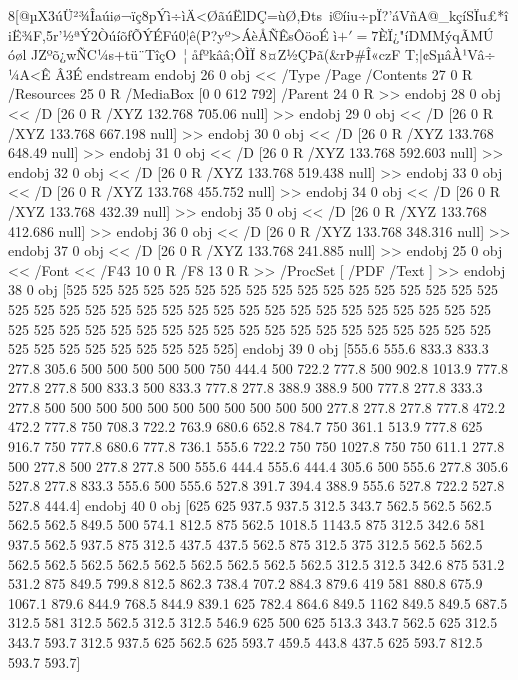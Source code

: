 {{{{8[@µX3úÜ²¾Îaúiø¬ïç8pÝì÷ìÄ<ØãúËlDÇ=ùØ,Ðts i©íiu÷pÏ?'áVñA@_kçíSÏu£*îiË¾F,5r'½ªÝ2ÒúíõfÕÝÉFú0¦ê(P?y­º>ÁèÅÑÊsÔöoÉ
ì$+'=7$ÈÏ¿"íDMMýqÃMÚ
óøl JZºõ¿wÑC¼s+tü¨TîçO~¦
åfºkââ;ÔÌÏ
8¤Z½ÇÞã({&rÞ#Î«czF
T;|¢SµâÀ¹Vâ÷
¼A<Ê%
Â3É
endstream
endobj
26 0 obj <<
/Type /Page
/Contents 27 0 R
/Resources 25 0 R
/MediaBox [0 0 612 792]
/Parent 24 0 R
>> endobj
28 0 obj <<
/D [26 0 R /XYZ 132.768 705.06 null]
>> endobj
29 0 obj <<
/D [26 0 R /XYZ 133.768 667.198 null]
>> endobj
30 0 obj <<
/D [26 0 R /XYZ 133.768 648.49 null]
>> endobj
31 0 obj <<
/D [26 0 R /XYZ 133.768 592.603 null]
>> endobj
32 0 obj <<
/D [26 0 R /XYZ 133.768 519.438 null]
>> endobj
33 0 obj <<
/D [26 0 R /XYZ 133.768 455.752 null]
>> endobj
34 0 obj <<
/D [26 0 R /XYZ 133.768 432.39 null]
>> endobj
35 0 obj <<
/D [26 0 R /XYZ 133.768 412.686 null]
>> endobj
36 0 obj <<
/D [26 0 R /XYZ 133.768 348.316 null]
>> endobj
37 0 obj <<
/D [26 0 R /XYZ 133.768 241.885 null]
>> endobj
25 0 obj <<
/Font << /F43 10 0 R /F8 13 0 R >>
/ProcSet [ /PDF /Text ]
>> endobj
38 0 obj
[525 525 525 525 525 525 525 525 525 525 525 525 525 525 525 525 525 525 525 525 525 525 525 525 525 525 525 525 525 525 525 525 525 525 525 525 525 525 525 525 525 525 525 525 525 525 525 525 525 525 525 525 525 525 525 525 525 525 525 525 525 525 525 525]
endobj
39 0 obj
[555.6 555.6 833.3 833.3 277.8 305.6 500 500 500 500 500 750 444.4 500 722.2 777.8 500 902.8 1013.9 777.8 277.8 277.8 500 833.3 500 833.3 777.8 277.8 388.9 388.9 500 777.8 277.8 333.3 277.8 500 500 500 500 500 500 500 500 500 500 500 277.8 277.8 277.8 777.8 472.2 472.2 777.8 750 708.3 722.2 763.9 680.6 652.8 784.7 750 361.1 513.9 777.8 625 916.7 750 777.8 680.6 777.8 736.1 555.6 722.2 750 750 1027.8 750 750 611.1 277.8 500 277.8 500 277.8 277.8 500 555.6 444.4 555.6 444.4 305.6 500 555.6 277.8 305.6 527.8 277.8 833.3 555.6 500 555.6 527.8 391.7 394.4 388.9 555.6 527.8 722.2 527.8 527.8 444.4]
endobj
40 0 obj
[625 625 937.5 937.5 312.5 343.7 562.5 562.5 562.5 562.5 562.5 849.5 500 574.1 812.5 875 562.5 1018.5 1143.5 875 312.5 342.6 581 937.5 562.5 937.5 875 312.5 437.5 437.5 562.5 875 312.5 375 312.5 562.5 562.5 562.5 562.5 562.5 562.5 562.5 562.5 562.5 562.5 562.5 312.5 312.5 342.6 875 531.2 531.2 875 849.5 799.8 812.5 862.3 738.4 707.2 884.3 879.6 419 581 880.8 675.9 1067.1 879.6 844.9 768.5 844.9 839.1 625 782.4 864.6 849.5 1162 849.5 849.5 687.5 312.5 581 312.5 562.5 312.5 312.5 546.9 625 500 625 513.3 343.7 562.5 625 312.5 343.7 593.7 312.5 937.5 625 562.5 625 593.7 459.5 443.8 437.5 625 593.7 812.5 593.7 593.7]
}}}}}
